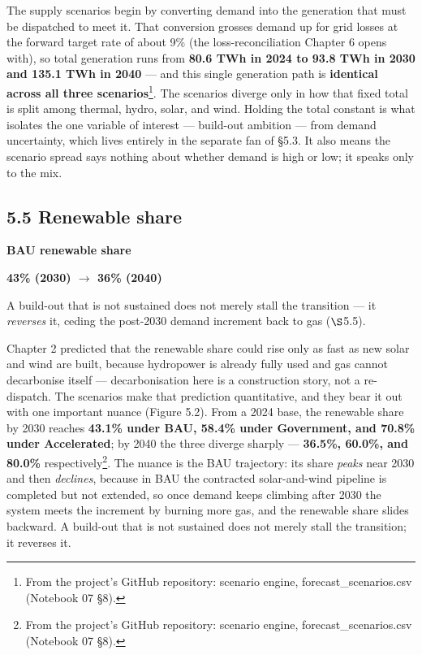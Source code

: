 \documentclass[10pt,twocolumn]{article}
\newcommand{\keystat}[3]{%
  \begin{keystatbox}%
  {\footnotesize\bfseries\color{skydeep}#1}\par\vspace{1pt}%
  {\Large\bfseries\color{navy}#2}\par\vspace{2pt}%
  {\footnotesize\color{ink}#3}%
  \end{keystatbox}}
\begin{document}
The supply scenarios begin by converting demand into the generation that must be dispatched to meet it. That conversion grosses demand up for grid losses at the forward target rate of about 9\% (the loss-reconciliation Chapter 6 opens with), so total generation runs from \textbf{80.6 TWh in 2024 to 93.8 TWh in 2030 and 135.1 TWh in 2040} --- and this single generation path is \textbf{identical across all three scenarios}\footnote{From the project's GitHub repository: scenario engine, forecast\_scenarios.csv (Notebook 07 \S{}8).}. The scenarios diverge only in how that fixed total is split among thermal, hydro, solar, and wind. Holding the total constant is what isolates the one variable of interest --- build-out ambition --- from demand uncertainty, which lives entirely in the separate fan of \S{}5.3. It also means the scenario spread says nothing about whether demand is high or low; it speaks only to the mix.

\subsection*{5.5 Renewable share}

\keystat{BAU renewable share}{43\% (2030) $\rightarrow$ 36\% (2040)}%
{A build-out that is not sustained does not merely stall the transition --- it
\emph{reverses} it, ceding the post-2030 demand increment back to gas ($\S$5.5).}

Chapter 2 predicted that the renewable share could rise only as fast as new solar and wind are built, because hydropower is already fully used and gas cannot decarbonise itself --- decarbonisation here is a construction story, not a re-dispatch. The scenarios make that prediction quantitative, and they bear it out with one important nuance (Figure 5.2). From a 2024 base, the renewable share by 2030 reaches \textbf{43.1\% under BAU, 58.4\% under Government, and 70.8\% under Accelerated}; by 2040 the three diverge sharply --- \textbf{36.5\%, 60.0\%, and 80.0\%} respectively\footnote{From the project's GitHub repository: scenario engine, forecast\_scenarios.csv (Notebook 07 \S{}8).}. The nuance is the BAU trajectory: its share \textit{peaks} near 2030 and then \textit{declines}, because in BAU the contracted solar-and-wind pipeline is completed but not extended, so once demand keeps climbing after 2030 the system meets the increment by burning more gas, and the renewable share slides backward. A build-out that is not sustained does not merely stall the transition; it reverses it.
\end{document}
